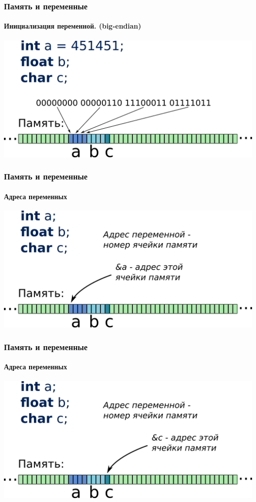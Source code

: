 \documentclass[12pt,pdf,hyperref={unicode}]{beamer}
\begin{document}
\begin{frame}[fragile]
\frametitle{Память и переменные} 
\framesubtitle{Инициализация переменной. (big-endian)} 
\begin{center}
\includegraphics[width=0.99\linewidth]{images/memory6.png}
\end{center}
\end{frame}

\begin{frame}[fragile]
\frametitle{Память и переменные} 
\framesubtitle{Адреса переменных} 
\begin{center}
\includegraphics[width=0.99\linewidth]{images/memory7.png}
\end{center}
\end{frame}

\begin{frame}[fragile]
\frametitle{Память и переменные} 
\framesubtitle{Адреса переменных} 
\begin{center}
\includegraphics[width=0.99\linewidth]{images/memory8.png}
\end{center}
\end{frame}
\end{document}
